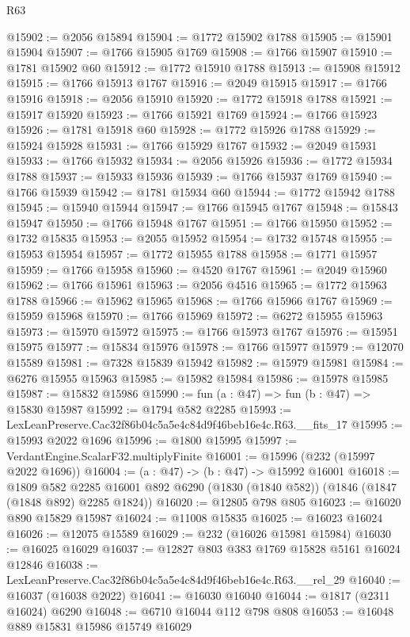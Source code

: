 \begin{lexlean}{R63}
\begin{coremodule}
@15902 := @2056 @15894
@15904 := @1772 @15902 @1788
@15905 := @15901 @15904
@15907 := @1766 @15905 @1769
@15908 := @1766 @15907
@15910 := @1781 @15902 @60
@15912 := @1772 @15910 @1788
@15913 := @15908 @15912
@15915 := @1766 @15913 @1767
@15916 := @2049 @15915
@15917 := @1766 @15916
@15918 := @2056 @15910
@15920 := @1772 @15918 @1788
@15921 := @15917 @15920
@15923 := @1766 @15921 @1769
@15924 := @1766 @15923
@15926 := @1781 @15918 @60
@15928 := @1772 @15926 @1788
@15929 := @15924 @15928
@15931 := @1766 @15929 @1767
@15932 := @2049 @15931
@15933 := @1766 @15932
@15934 := @2056 @15926
@15936 := @1772 @15934 @1788
@15937 := @15933 @15936
@15939 := @1766 @15937 @1769
@15940 := @1766 @15939
@15942 := @1781 @15934 @60
@15944 := @1772 @15942 @1788
@15945 := @15940 @15944
@15947 := @1766 @15945 @1767
@15948 := @15843 @15947
@15950 := @1766 @15948 @1767
@15951 := @1766 @15950
@15952 := @1732 @15835
@15953 := @2055 @15952
@15954 := @1732 @15748
@15955 := @15953 @15954
@15957 := @1772 @15955 @1788
@15958 := @1771 @15957
@15959 := @1766 @15958
@15960 := @4520 @1767
@15961 := @2049 @15960
@15962 := @1766 @15961
@15963 := @2056 @4516
@15965 := @1772 @15963 @1788
@15966 := @15962 @15965
@15968 := @1766 @15966 @1767
@15969 := @15959 @15968
@15970 := @1766 @15969
@15972 := @6272 @15955 @15963
@15973 := @15970 @15972
@15975 := @1766 @15973 @1767
@15976 := @15951 @15975
@15977 := @15834 @15976
@15978 := @1766 @15977
@15979 := @12070 @15589
@15981 := @7328 @15839 @15942
@15982 := @15979 @15981
@15984 := @6276 @15955 @15963
@15985 := @15982 @15984
@15986 := @15978 @15985
@15987 := @15832 @15986
@15990 := fun (a : @47) => fun (b : @47) => @15830 @15987
@15992 := @1794 @582 @2285
@15993 := LexLeanPreserve.Cac32f86b04c5a5e4c84d9f46beb16e4c.R63.__fits_17
@15995 := @15993 @2022 @1696
@15996 := @1800 @15995
@15997 := VerdantEngine.ScalarF32.multiplyFinite
@16001 := @15996 (@232 (@15997 @2022 @1696))
@16004 := (a : @47) -> (b : @47) -> @15992 @16001
@16018 := @1809
    @582
    @2285
    @16001
    @892
    @6290
    (@1830 (@1840 @582))
    (@1846 (@1847 (@1848 @892) @2285 @1824))
@16020 := @12805 @798 @805
@16023 := @16020 @890 @15829 @15987
@16024 := @11008 @15835
@16025 := @16023 @16024
@16026 := @12075 @15589
@16029 := @232 (@16026 @15981 @15984)
@16030 := @16025 @16029
@16037 := @12827 @803 @383 @1769 @15828 @5161 @16024 @12846
@16038 := LexLeanPreserve.Cac32f86b04c5a5e4c84d9f46beb16e4c.R63.__rel_29
@16040 := @16037 (@16038 @2022)
@16041 := @16030 @16040
@16044 := @1817 (@2311 @16024) @6290
@16048 := @6710 @16044 @112 @798 @808
@16053 := @16048 @889 @15831 @15986 @15749 @16029

\end{coremodule}
\end{lexlean}
